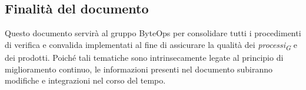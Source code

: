 \subsection{Finalità del documento}
Questo documento servirà al gruppo ByteOps per consolidare tutti i procedimenti di verifica e convalida implementati al fine di assicurare la qualità dei \textit{processi}\textsubscript{\textit{G}} e dei prodotti. Poiché tali tematiche sono intrinsecamente legate al principio di miglioramento continuo, le informazioni presenti nel documento subiranno modifiche e integrazioni nel corso del tempo. 